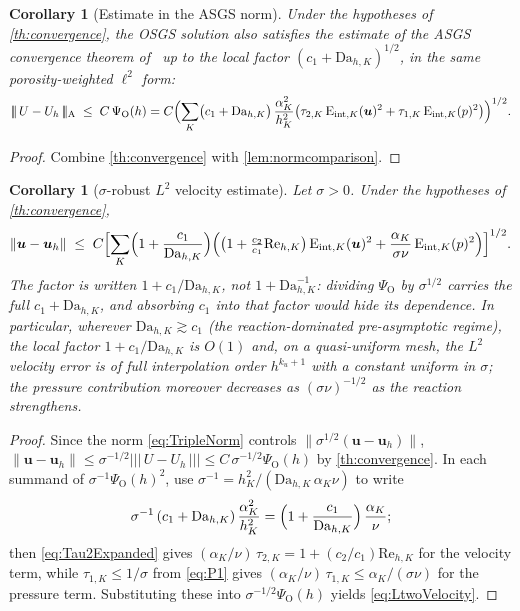 \documentclass[11pt]{article}
\newtheorem{corollary}[theorem]{Corollary}
\theoremstyle{remark}
\newcommand{\bu}{\boldsymbol{u}}
\newcommand{\norm}[1]{\lVert #1 \rVert}
\newcommand{\tnorm}[1]{\lvert\!\lvert\!\lvert\, #1 \,\rvert\!\rvert\!\rvert}
\newcommand{\Eint}[2]{\mathrm{E}_{\mathrm{int},#1}(#2)}
\newcommand{\Dah}{\mathrm{Da}_{h,K}}
\newcommand{\Reh}{\mathrm{Re}_{h,K}}
\begin{document}
\begin{corollary}[Estimate in the ASGS norm]
\label{cor:asgsnorm}
Under the hypotheses of \cref{th:convergence}, the OSGS solution also satisfies the
estimate of the ASGS convergence theorem of~\cite{companion} up to the local factor
$(c_1+\Dah)^{1/2}$, in the same porosity-weighted $\ell^2$ form:
\[
  \tnorm{U - U_h}_{\mathrm{A}}
  \;\le\;
  C\,\Psi_{\mathrm O}(h)
  = C\Bigl( \sum_K \bigl( c_1 + \Dah \bigr)\,\frac{\alpha_K^2}{h_K^2}
  \bigl( \tau_{2,K}\,\Eint{K}{\bu}^2 + \tau_{1,K}\,\Eint{K}{p}^2 \bigr) \Bigr)^{1/2} .
\]
\end{corollary}

\begin{proof}
Combine \cref{th:convergence} with \cref{lem:normcomparison}.
\end{proof}

\begin{corollary}[$\sigma$-robust $L^2$ velocity estimate]
\label{cor:Ltwo}
Let $\sigma > 0$. Under the hypotheses of \cref{th:convergence},
\begin{equation}
  \label{eq:LtwoVelocity}
  \norm{\bu - \bu_h}
  \;\le\;
  C \Bigl[ \sum_K \Bigl( 1 + \frac{c_1}{\Dah} \Bigr)
  \Bigl(
  \bigl( 1 + \tfrac{c_2}{c_1}\Reh \bigr)\, \Eint{K}{\bu}^2
  + \frac{\alpha_K}{\sigma\nu}\, \Eint{K}{p}^2
  \Bigr) \Bigr]^{1/2}.
\end{equation}
The factor is written $1+c_1/\Dah$, not $1+\Dah^{-1}$: dividing $\Psi_{\mathrm O}$ by
$\sigma^{1/2}$ carries the full $c_1+\Dah$, and absorbing $c_1$ into that factor would hide
its dependence. In particular, wherever $\Dah \gtrsim c_1$ (the reaction-dominated
pre-asymptotic regime), the local factor $1+c_1/\Dah$ is $O(1)$ and, on a quasi-uniform
mesh, the $L^2$ velocity error is of full interpolation order $h^{k_u+1}$ with a constant
uniform in $\sigma$; the pressure contribution moreover \emph{decreases} as
$(\sigma\nu)^{-1/2}$ as the reaction strengthens.
\end{corollary}

\begin{proof}
Since the norm \cref{eq:TripleNorm} controls $\norm{\sigma^{1/2}(\bu-\bu_h)}$,
$\norm{\bu - \bu_h} \le \sigma^{-1/2}\tnorm{U - U_h} \le
C\,\sigma^{-1/2}\Psi_{\mathrm O}(h)$ by \cref{th:convergence}. In each summand of
$\sigma^{-1}\Psi_{\mathrm O}(h)^2$, use $\sigma^{-1} = h_K^2/(\Dah\,\alpha_K\nu)$ to write
\[
  \sigma^{-1}\,(c_1+\Dah)\,\frac{\alpha_K^2}{h_K^2}
  = \Bigl(1 + \frac{c_1}{\Dah}\Bigr)\,\frac{\alpha_K}{\nu};
\]
then \cref{eq:Tau2Expanded} gives $(\alpha_K/\nu)\,\tau_{2,K} = 1 + (c_2/c_1)\Reh$ for the
velocity term, while $\tau_{1,K} \le 1/\sigma$ from \cref{eq:P1} gives
$(\alpha_K/\nu)\,\tau_{1,K} \le \alpha_K/(\sigma\nu)$ for the pressure term. Substituting
these into $\sigma^{-1/2}\Psi_{\mathrm O}(h)$ yields \cref{eq:LtwoVelocity}. \qedhere
\end{proof}
\end{document}
